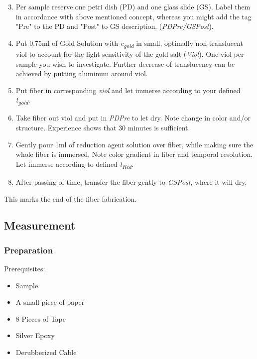 \begin{enumerate}
\setcounter{enumi}{2}
    
    \item Per sample reserve one petri dish (PD) and one glass slide (GS). Label them in accordance with above mentioned concept, whereas you might add the tag "Pre" to the PD and "Post" to GS description. (\textit{PDPre/GSPost}).
    
    \item Put 0.75ml of Gold Solution with \textit{c\textsubscript{gold}} in small, optimally non-translucent viol to account for the light-sensitivity of the gold salt (\textit{Viol}). One viol per sample you wish to investigate. Further decrease of translucency can be achieved by putting aluminum around viol.
    
    \item Put fiber in corresponding \textit{viol} and let immerse according to your defined \textit{t\textsubscript{gold}}.
    \item Take fiber out viol and put in \textit{PDPre} to let dry. Note change in color and/or structure. Experience shows that 30 minutes is sufficient.
    
    \item Gently pour 1ml of reduction agent solution over fiber, while making sure the whole fiber is immersed. Note color gradient in fiber and temporal resolution. Let immerse according to defined \textit{t\textsubscript{Red}}.
    
    \item After passing of time, transfer the fiber gently to \textit{GSPost}, where it will dry.
    \end{enumerate}
    
    \begin{center}
        This marks the end of the fiber fabrication.
    \end{center}

\subsection{Measurement}

\subsubsection{Preparation}
Prerequisites:
\begin{multicols}{2}
\begin{itemize}
    \item Sample
    \item A small piece of paper
    \item 8 Pieces of Tape
    \item Silver Epoxy
    \item Derubberized Cable
\end{itemize}
\end{multicols}

